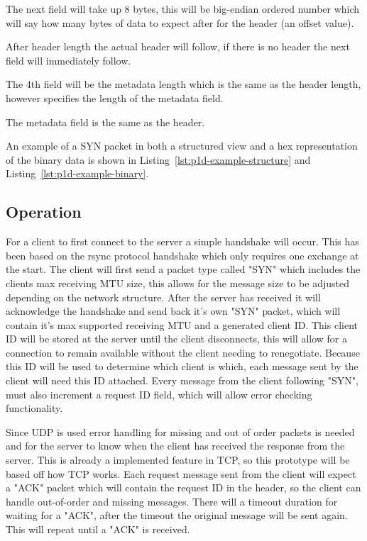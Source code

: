 The next field will take up 8 bytes, this will be big-endian ordered number which will say how many bytes of data to expect after for the header (an offset value).

After header length the actual header will follow, if there is no header the next field will immediately follow.

The 4th field will be the metadata length which is the same as the header length, however specifies the length of the metadata field.

The metadata field is the same as the header.

An example of a SYN packet in both a structured view and a hex representation of the binary data is shown in Listing~\ref{lst:p1d-example-structure} and Listing~\ref{lst:p1d-example-binary}.

\subsection*{Operation}
For a client to first connect to the server a simple handshake will occur. This has been based on the rsync protocol handshake which only requires one exchange at the start. The client will first send a packet type called "SYN" which includes the clients max receiving MTU size, this allows for the message size to be adjusted depending on the network structure. After the server has received it will acknowledge the handshake and send back it's own "SYN" packet, which will contain it's max supported receiving MTU and a generated client ID. This client ID will be stored at the server until the client disconnects, this will allow for a connection to remain available without the client needing to renegotiate. Because this ID will be used to determine which client is which, each message sent by the client will need this ID attached. Every message from the client following "SYN", must also increment a request ID field, which will allow error checking functionality.

Since UDP is used error handling for missing and out of order packets is needed and for the server to know when the client has received the response from the server. This is already a implemented feature in TCP, so this prototype will be based off how TCP works. Each request message sent from the client will expect a "ACK" packet which will contain the request ID in the header, so the client can handle out-of-order and missing messages. There will a timeout duration for waiting for a "ACK", after the timeout the original message will be sent again. This will repeat until a "ACK" is received.

